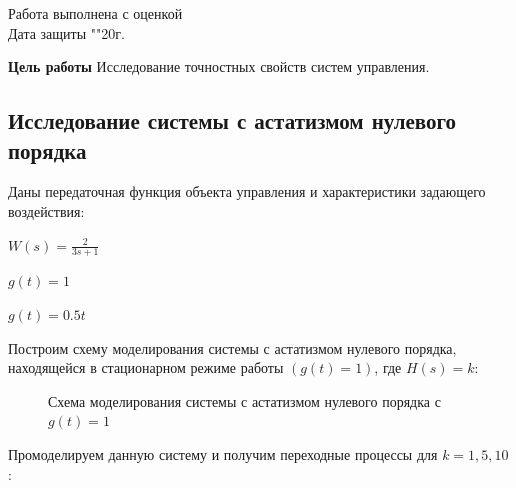 \documentclass[a4paper, 11pt]{article}
\begin{document}
\begin{titlepage}
		Работа выполнена с оценкой \hspace{1cm} \underline{\hspace{8cm}} \\ 
		\vspace{1cm}
		Дата защиты "\underline{\hspace{0.7cm}}"\hspace{0.2cm}\underline{\hspace{2cm}}\hspace{0.2cm}20\underline{\hspace{0.7cm}}г.

\end{titlepage}


\par
\textbf{Цель работы}
Исследование точностных свойств систем управления.

\begin{center}
\section{Исследование системы с астатизмом нулевого порядка}
\end{center}

\par
Даны передаточная функция объекта управления и характеристики задающего воздействия:
\par
$W(s) = \displaystyle \frac{2}{3s+1}$
\par
$g(t) = 1$
\par
$g(t)=0.5t$
\par
Построим схему моделирования системы с астатизмом нулевого порядка, находящейся в стационарном режиме работы $(g(t) = 1)$, где $H(s)=k$:

\begin{figure}[h!]
\caption{Схема моделирования системы с астатизмом нулевого порядка с $g(t)=1$}
\label{ris:image}
\end{figure}

\par 
Промоделируем данную систему и получим переходные процессы для $k=1,5,10$:
\end{document}
